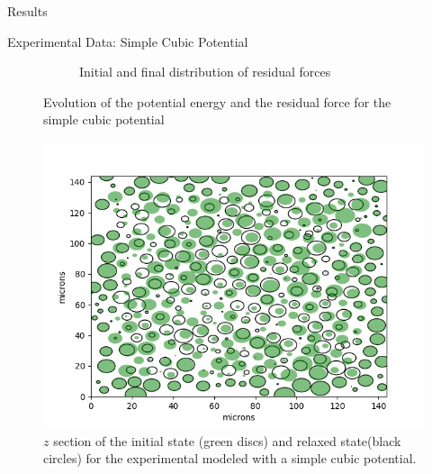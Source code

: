 \documentclass[12pt]{article}
\begin{document}
\begin{section}{Results}
\begin{subsection}{Experimental Data: Simple Cubic Potential}
\begin{figure}[h!]
\begin{subfigure}{0.5\textwidth}
        \caption{Initial and final distribution of residual forces}
        \label{fig:sub2}
    \end{subfigure}
    \caption{Evolution of the potential energy and the residual force for the simple cubic potential}
\end{figure}
\begin{figure}[h!]
    \centering
    \includegraphics[width=0.6\linewidth]{images/emulsion_cubic_cross_section.jpg}
    \caption{$z$ section of the initial state (green discs) and relaxed state(black circles) for the experimental modeled with a simple cubic potential.}
    \label{fig:my_label}
\end{figure}
\end{subsection}


\end{section}
\end{document}
